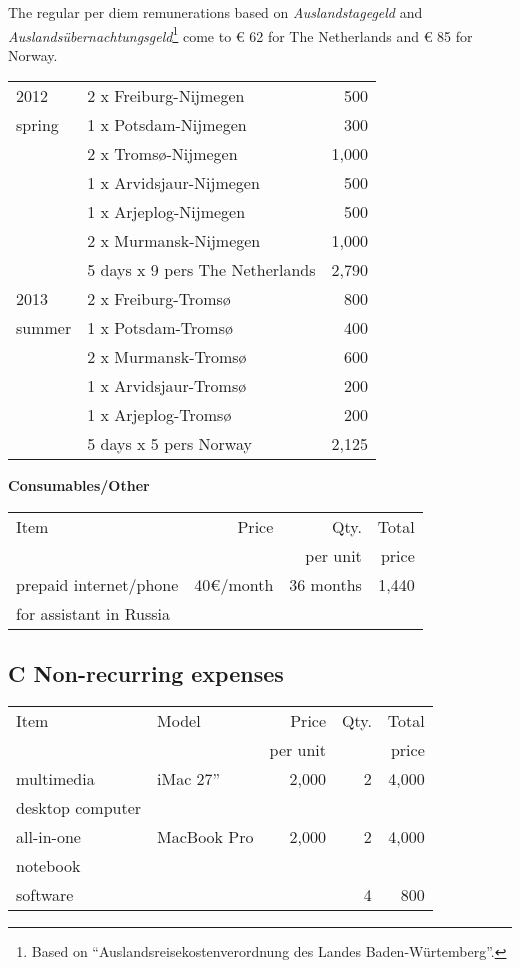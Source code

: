 \documentclass[a4paper,12pt]{article}
\begin{document}
{{{{\noindent The regular per diem remunerations based on \textit{Auslandstagegeld} and \textit{Auslandsübernachtungsgeld}\footnote{Based on “Auslandsreisekostenverordnung des Landes Baden-Würtemberg”.} come to € 62 for The Netherlands and € 85 for Norway.

\begin{longtable}{| l | l | r |}
\hline
\hline
2012		& 2 x Freiburg-Nijmegen&500\\
spring	& 1 x Potsdam-Nijmegen&300\\
		& 2 x Tromsø-Nijmegen&1,000\\
		& 1 x Arvidsjaur-Nijmegen&500\\
		& 1 x Arjeplog-Nijmegen&500\\
		& 2 x Murmansk-Nijmegen&1,000\\
		& 5 days x 9 pers The Netherlands&2,790\\
\hline
2013		& 2 x Freiburg-Tromsø&800\\
summer	& 1 x Potsdam-Tromsø&400\\
		& 2 x Murmansk-Tromsø&600\\
		& 1 x Arvidsjaur-Tromsø&200\\
		& 1 x Arjeplog-Tromsø&200\\
		& 5 days x 5 pers Norway&2,125\\
\hline
\end{longtable}

\noindent \textbf{Consumables/Other}
\begin{longtable}{| l |  r | r | r |}
\hline
Item	&Price	&Qty.		&Total\\
	&	&per unit	&price\\
\hline		
prepaid internet/phone&40€/month&36 months&1,440\\
for assistant in Russia&&&\\
\hline
\end{longtable}

\subsection*{C Non-recurring expenses}
\begin{longtable}{| l | l | r | r | r |}
\hline
Item&Model&Price&Qty.&Total\\
	&&per unit&&price\\
\hline
multimedia&iMac 27”&2,000&2&4,000\\
desktop computer&&&&\\
\hline
all-in-one&MacBook Pro&2,000&2&4,000\\
notebook&&&&\\
\hline
software&	  &	&4&800\\
\hline
\end{longtable}

}}}}
\end{document}
